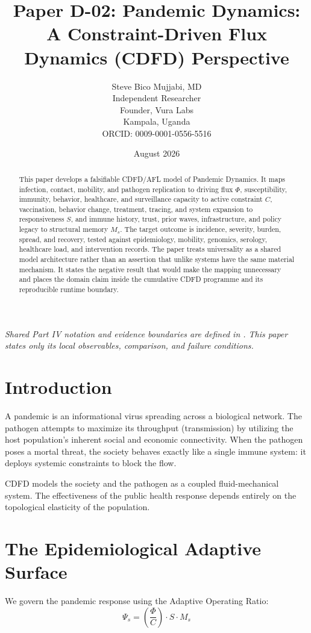 \documentclass[11pt,a4paper]{article}
\title{\textbf{Paper D-02: Pandemic Dynamics:\\ A Constraint-Driven Flux Dynamics (CDFD) Perspective}}
\author{Steve Bico Mujjabi, MD\\
\small Independent Researcher\\
\small Founder, Vura Labs\\
\small Kampala, Uganda\\
\small ORCID: 0009-0001-0556-5516}
\date{August 2026}
\begin{document}
\maketitle

\noindent\textit{Shared Part IV notation and evidence boundaries are defined in . This paper states only its local observables, comparison, and failure conditions.}


\begin{abstract}
This paper develops a falsifiable CDFD/AFL model of Pandemic Dynamics. It maps infection, contact, mobility, and pathogen replication to driving flux $\Phi$, susceptibility, immunity, behavior, healthcare, and surveillance capacity to active constraint $C$, vaccination, behavior change, treatment, tracing, and system expansion to responsiveness $S$, and immune history, trust, prior waves, infrastructure, and policy legacy to structural memory $M_s$. The target outcome is incidence, severity, burden, spread, and recovery, tested against epidemiology, mobility, genomics, serology, healthcare load, and intervention records. The paper treats universality as a shared model architecture rather than an assertion that unlike systems have the same material mechanism. It states the negative result that would make the mapping unnecessary and places the domain claim inside the cumulative CDFD programme and its reproducible runtime boundary.
\end{abstract}

\section{Introduction}

A pandemic is an informational virus spreading across a biological network. The pathogen attempts to maximize its throughput (transmission) by utilizing the host population's inherent social and economic connectivity. When the pathogen poses a mortal threat, the society behaves exactly like a single immune system: it deploys systemic constraints to block the flow.

CDFD models the society and the pathogen as a coupled fluid-mechanical system. The effectiveness of the public health response depends entirely on the topological elasticity of the population.

\section{The Epidemiological Adaptive Surface}
We govern the pandemic response using the Adaptive Operating Ratio:
\begin{equation}
    \Psi_s = \left( \frac{\Phi}{C} \right) \cdot S \cdot M_s
\end{equation}
\end{document}
